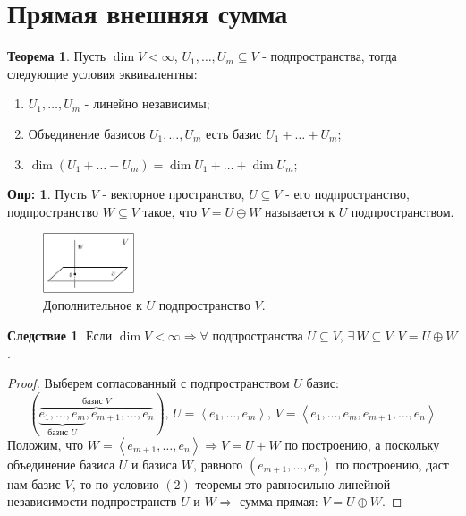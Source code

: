 \documentclass[12pt]{article}
\theoremstyle{definition}
\newtheorem{defn}{Опр:}
\newtheorem{theorem}{Теорема}
\newtheorem{corollary}{Следствие}
\newcommand{\linsp}[1]{\left\langle #1 \right\rangle }
\begin{document}

\section*{Прямая внешняя сумма}

\begin{theorem}
	Пусть $\dim{V} < \infty$, $U_1, \dotsc, U_m \subseteq V$  - подпространства, тогда следующие условия эквивалентны:
	\begin{enumerate}[label=(\arabic*)]
		\item $U_1,\dotsc, U_m$ - линейно независимы;
		\item Объединение базисов $U_1, \dotsc, U_m$ есть базис $U_1 + \dotsc + U_m$;
		\item $\dim{(U_1 + \dotsc + U_m)} = \dim{U_1} + \dotsc + \dim{U_m}$;
	\end{enumerate}
\end{theorem}

\begin{defn}
	Пусть $V$ - векторное пространство, $U \subseteq V$ - его подпространство, подпространство $W \subseteq V$ такое, что $V = U \oplus W$ называется  к $U$ подпространством.
\end{defn}

\begin{figure}[H]
	\centering
	\includegraphics[width=0.24\textwidth]{LAL4_1.eps}
	\caption{Дополнительное к $U$ подпространство $V$.}
	\label{4_1}
\end{figure}

\begin{corollary}
	Если $\dim{V} < \infty \Rightarrow \forall$ подпространства $U \subseteq V, \, \exists\, W \subseteq V \colon V = U \oplus W$.
\end{corollary}
\begin{proof}
	Выберем согласованный с подпространством $U$ базис:
	$$
		(\overbrace{\underbrace{e_1, \dotsc, e_m}_{\text{базис } U}, e_{m+1}, \dotsc, e_n}^{\text{базис }V}), \, U = \linsp{e_1, \dotsc, e_m}, \, V = \linsp{e_1, \dotsc, e_m,e_{m+1}, \dotsc, e_n}
	$$
	Положим, что $W = \linsp{e_{m+1}, \dotsc, e_n} \Rightarrow V = U + W$ по построению, а поскольку объединение базиса $U$ и базиса $W$, равного $(e_{m+1}, \dotsc, e_n)$ по построению, даст нам базис $V$, то по условию $(2)$ теоремы это равносильно линейной независимости подпространств $U$ и $W \Rightarrow$ сумма прямая: $V =U \oplus W$.
\end{proof}
\end{document}
